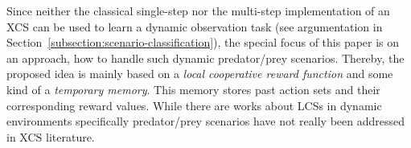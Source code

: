 Since neither the classical single-step nor the multi-step implementation of an XCS \cite{BW02} can be used to learn a dynamic observation task %
(see argumentation in Section~\ref{subsection:scenario-classification}), the special focus of this paper is on an approach, how to handle such dynamic predator/prey scenarios. Thereby, the proposed idea is mainly based on a \emph{local cooperative reward function} and some kind of a \emph{temporary memory}. This memory stores past action sets and their corresponding reward values. 
While there are works about LCSs in dynamic environments \cite{Lan98,LW00} specifically predator/prey scenarios have not really been addressed in XCS literature.




